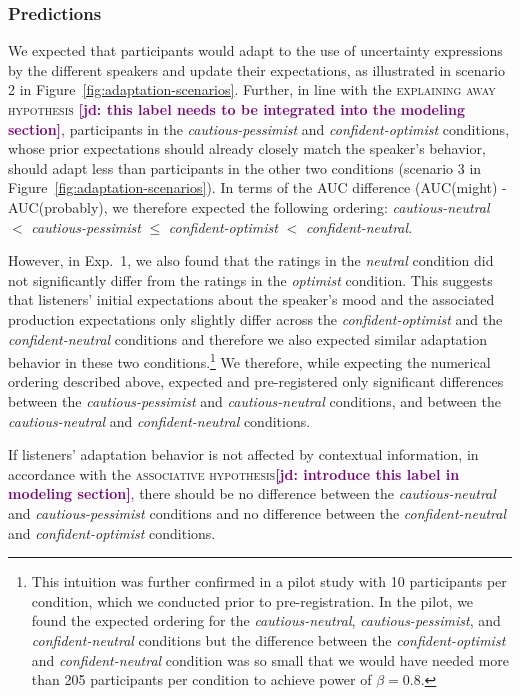 \documentclass[man,floatsintext]{apa6}
\newcommand{\jd}[1]{\textcolor{Purple}{\bf [jd: #1]}}
\begin{document}
\subsubsection{Predictions}

We expected that participants would adapt to the use of uncertainty expressions by the different speakers and update their expectations, as illustrated in scenario 2 in Figure~\ref{fig:adaptation-scenarios}. Further, in line with the \textsc{explaining away hypothesis} \jd{this label needs to be integrated into the modeling section}, participants in the \textit{cautious-pessimist} and \textit{confident-optimist} conditions, whose prior expectations should already closely match the speaker's behavior,  should adapt less than participants in the other two conditions (scenario 3 in Figure~\ref{fig:adaptation-scenarios}). In terms of the AUC difference (AUC(might) - AUC(probably), we therefore expected the following ordering: \textit{cautious-neutral} $<$  \textit{cautious-pessimist} $\leq$ \textit{confident-optimist} $<$ \textit{confident-neutral}.

However, in Exp.~1, we also found that the ratings in the \textit{neutral} condition did not significantly differ from the ratings in the \textit{optimist} condition. This suggests that listeners' initial expectations about the speaker's mood and the associated production expectations only slightly differ across the \textit{confident-optimist} and the \textit{confident-neutral} conditions and therefore we also expected similar adaptation behavior in these two conditions.\footnote{This intuition was further confirmed in a pilot study with 10 participants per condition, which we conducted prior to pre-registration. In the pilot, we found the expected ordering for the \textit{cautious-neutral}, \textit{cautious-pessimist}, and \textit{confident-neutral} conditions but the difference between the \textit{confident-optimist} and \textit{confident-neutral} condition was so small that we would have needed more than 205 participants per condition to achieve power of $\beta=0.8$.} We therefore, while expecting the numerical ordering described above, expected and pre-registered only significant differences between the \textit{cautious-pessimist} and \textit{cautious-neutral} conditions, and between the \textit{cautious-neutral} and \textit{confident-neutral} conditions.

If listeners' adaptation behavior is not affected by contextual information, in accordance with the \textsc{associative hypothesis}\jd{introduce this label in modeling section}, there should be no difference between the \textit{cautious-neutral} and  \textit{cautious-pessimist} conditions and no difference between the \textit{confident-neutral} and \textit{confident-optimist} conditions. 
\end{document}
